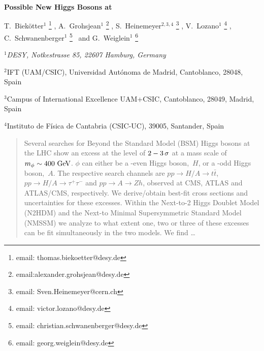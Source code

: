 \documentclass[12pt]{article}
\begin{document}
\thispagestyle{empty}


\def\thefootnote{\fnsymbol{footnote}}

\begin{flushright}
\mbox{}
\end{flushright}

\vspace{0.5cm}

\begin{center}

{\large\sc
{\bf Possible New Higgs Bosons at \boldmath{$\sim 400 \gev$}
}}

\vspace{1cm}


{\sc
T.~Biek\"otter$^{1}$%
\footnote{email: thomas.biekoetter@desy.de}%
, A.~Grohsjean$^1$%
\footnote{email:alexander.grohsjean@desy.de}%
, S.~Heinemeyer$^{2,3,4}$%
\footnote{email: Sven.Heinemeyer@cern.ch}%
, V.~Lozano$^1$%
\footnote{email: victor.lozano@desy.de}%
,\\[.5em] C.~Schwanenberger$^1$%
\footnote{email: christian.schwanenberger@desy.de}%
~and G.~Weiglein$^{1}$%
\footnote{email: georg.weiglein@desy.de}%
}

\vspace*{.7cm}

{\sl
$^1$DESY, Notkestrasse 85, 22607 Hamburg, Germany

\vspace*{0.1cm}

$^2$IFT (UAM/CSIC), Universidad Aut\'onoma de Madrid, 
Cantoblanco, 28048, Spain

\vspace{0.1cm}

$^3$Campus of International Excellence UAM+CSIC, 
Cantoblanco, 28049, Madrid, Spain 

\vspace*{0.1cm}

$^4$Instituto de F\'isica de Cantabria (CSIC-UC), 
39005, Santander, Spain
}

\end{center}

\vspace*{0.1cm}

\begin{abstract}
\noindent
Several searches for Beyond the Standard Model (BSM) Higgs bosons at the
LHC show an excess at the level of $2-3\,\sigma$ at a mass scale of
$m_\phi \sim 400 \,\, \mathrm{GeV}$. $\phi$ can either be a \cp-even Higgs boson,~$H$,
or a \cp-odd Higgs boson,~$A$. The respective search channels are
$pp \to H/A \to t \bar t$, $pp \to H/A \to \tau^+\tau^-$ and
$pp \to A \to Z h$, observed at CMS, ATLAS and ATLAS/CMS, respectively.
We derive/obtain best-fit cross sections and uncertainties for these excesses. 
Within the Next-to-2 Higgs Doublet Model (N2HDM) and the Next-to Minimal
Supersymmetric Standard Model (NMSSM) we analyze to what extent one, two
or three of these excesses can be fit simultaneously in the two models.
We find \ldots
\end{abstract}
\end{document}
